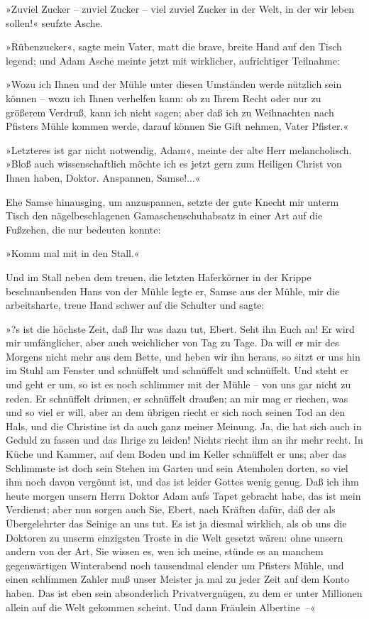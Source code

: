 »Zuviel Zucker – zuviel Zucker – viel zuviel Zucker in der Welt, in
der wir leben sollen!« seufzte Asche.

»Rübenzucker«, sagte mein Vater, matt die brave, breite Hand auf
den Tisch legend; und Adam Asche meinte jetzt mit wirklicher,
aufrichtiger Teilnahme:

»Wozu ich Ihnen und der Mühle unter diesen Umständen werde nützlich
sein können – wozu ich Ihnen verhelfen kann: ob zu Ihrem Recht oder
nur zu größerem Verdruß, kann ich nicht sagen; aber daß ich zu
Weihnachten nach Pfisters Mühle kommen werde, darauf können Sie
Gift nehmen, Vater Pfister.«

»Letzteres ist gar nicht notwendig, Adam«, meinte der alte Herr
melancholisch. »Bloß auch wissenschaftlich möchte ich es jetzt gern
zum Heiligen Christ von Ihnen haben, Doktor. Anspannen, Samse!...«

Ehe Samse hinausging, um anzuspannen, setzte der gute Knecht mir
unterm Tisch den nägelbeschlagenen Gamaschenschuhabsatz in einer
Art auf die Fußzehen, die nur bedeuten konnte:

»Komm mal mit in den Stall.«

Und im Stall neben dem treuen, die letzten Haferkörner in der
Krippe beschnaubenden Hans von der Mühle legte er, Samse aus der
Mühle, mir die arbeitsharte, treue Hand schwer auf die Schulter und
sagte:

»?s ist die höchste Zeit, daß Ihr was dazu tut, Ebert. Seht ihn
Euch an! Er wird mir umfänglicher, aber auch weichlicher von Tag zu
Tage. Da will er mir des Morgens nicht mehr aus dem Bette, und
heben wir ihn heraus, so sitzt er uns hin im Stuhl am Fenster und
schnüffelt und schnüffelt und schnüffelt. Und steht er und geht er
um, so ist es noch schlimmer mit der Mühle – von uns gar nicht zu
reden. Er schnüffelt drinnen, er schnüffelt draußen; an mir mag er
riechen, was und so viel er will, aber an dem übrigen riecht er
sich noch seinen Tod an den Hals, und die Christine ist da auch
ganz meiner Meinung. Ja, die hat sich auch in Geduld zu fassen und
das Ihrige zu leiden! Nichts riecht ihm an ihr mehr recht. In Küche
und Kammer, auf dem Boden und im Keller schnüffelt er uns; aber das
Schlimmste ist doch sein Stehen im Garten und sein Atemholen
dorten, so viel ihm noch davon vergönnt ist, und das ist leider
Gottes wenig genug. Daß ich ihm heute morgen unsern Herrn Doktor
Adam aufs Tapet gebracht habe, das ist mein Verdienst; aber nun
sorgen auch Sie, Ebert, nach Kräften dafür, daß der als
Übergelehrter das Seinige an uns tut. Es ist ja diesmal wirklich,
als ob uns die Doktoren zu unserm einzigsten Troste in die Welt
gesetzt wären: ohne unsern andern von der Art, Sie wissen es, wen
ich meine, stünde es an manchem gegenwärtigen Winterabend noch
tausendmal elender um Pfisters Mühle, und einen schlimmen Zahler
muß unser Meister ja mal zu jeder Zeit auf dem Konto haben. Das ist
eben sein absonderlich Privatvergnügen, zu dem er unter Millionen
allein auf die Welt gekommen scheint. Und dann Fräulein
Albertine~–«

